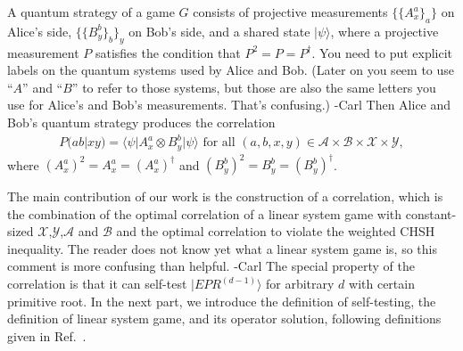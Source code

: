 \documentclass[11pt,letterpaper]{article}
\newcommand{\ket}[1]{|#1\rangle}
\newcommand{\bra}[1]{\langle#1|}
\newcommand{\x}{\otimes}
\newcommand{\ct}{^{\dagger}}
\newcommand{\calX}{\mathcal{X}}
\newcommand{\calY}{\mathcal{Y}}
\newcommand{\calA}{\mathcal{A}}
\newcommand{\calB}{\mathcal{B}}
\newcommand{\1}{\mathbb{1}}
\newcommand{\EPR}[1]{EPR^{(#1)}}
\newcommand{\pr}[2]{P(#1|#2)}
\def\carl#1{{\color{blue} #1 -Carl}}
\theoremstyle{definition}
\begin{document}
A quantum strategy of a game $G$ consists of projective measurements $\{\{A_x^a\}_a\}$ on Alice's side, 
$\{\{B_y^b\}_b\}_y$ on Bob's side, and a shared state $\ket{\psi}$, where a projective measurement $P$ satisfies
the condition that $P^2 = P = P\ct$.  \carl{You need to put explicit labels on the quantum systems used by
Alice and Bob.  (Later on you seem to use ``$A$'' and ``$B$'' to refer to those systems, but those are also
the same letters you use for Alice's and Bob's measurements.  That's confusing.)}
Then Alice and Bob's quantum strategy produces the correlation
\begin{align}
	\pr{ab}{xy} = \bra{\psi} A_x^a \x B_y^b \ket{\psi} \text{ for all } (a,b,x,y) \in \calA \times \calB \times \calX \times \calY,
\end{align}
where $(A_x^a)^2 = A_x^a = (A_x^a)^\dagger$ and $(B_y^b)^2 = B_y^b = (B_y^b)^\dagger$.

The main contribution of our work is the construction of a correlation, which is the combination of 
the optimal correlation of a linear system game with constant-sized $\calX$,$\calY$,$\calA$ and $\calB$
and the optimal correlation to violate the weighted CHSH inequality.  \carl{The reader does not 
know yet what a linear system game is, so this comment is more confusing than helpful.}
The special property of the correlation is that it can self-test $\ket{\EPR{d-1}}$ for arbitrary $d$ with certain 
primitive root. 
In the next part, we introduce the definition of self-testing, the definition of linear system game, 
and its operator solution, 
following definitions given in Ref.~\cite{coladan2017, slofstra2017}.
\end{document}
